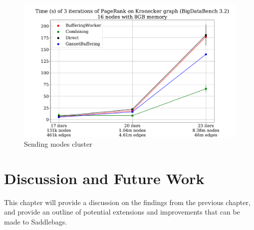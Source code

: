 \documentclass{uit-report}
\begin{document}
\begin{figure}[H]
	\centering
	\includegraphics[width=15cm]{illustrations/sendingmodesabel.pdf}
	\caption{Sending modes cluster}
	\label{fig:sendingmodesabel}
\end{figure}


\newpage
\mbox{} \pagebreak
\newpage
\chapter{Discussion and Future Work} \label{section:discussion}
This chapter will provide a discussion on the findings from the previous chapter, and provide an outline of potential extensions and improvements that can be made to Saddlebags. 
\end{document}
